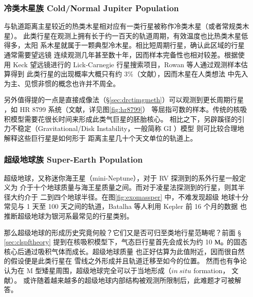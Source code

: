 \subsubsection{冷类木星族  Cold/Normal Jupiter Population}

与轨道距离主星较近的热类木星相对应有一类行星被称作冷类木星（或者常规类木星）。
此类行星在观测上拥有长于约一百天的轨道周期，有效温度也比热类木星低得多，太阳
系木星就属于一颗典型冷木星。相比短周期行星，确认此区域的行星通常需要望远镜
连续观测几年甚至数十年，因而样本完备性也相对较差\cite{Cumming2008}。根据使用
 Keck 望远镜进行的 Lick-Carnegie 行星搜索项目，Rowan 等人通过观测样本估算得到
此类行星的出现概率大概只有约 3\%（文献），因而木星在人类想法
中先入为主、见惯非惯的概念也许并不周全。

另外值得提的一点是直接成像法（\S \ref{sec:drctimgmeth}）可以观测到更长周期行星
，如 HR 8799 系统（文献，详见图\ref{fig:hr8799}）
等屈指可数的样本。传统的核吸积模型需要花很长时间来形成此类气巨星的胚胎核心。
相比之下，另辟蹊径的引力不稳定（Gravitational/Disk Instability，一般简称 GI ）模型
\cite{Kuiper1951,Cameron1978,Boss1997}则可比较合理地解释这些巨行星是如何形于
距离主星几十个天文单位的轨道上\cite{Durisen2007}。



\subsubsection{超级地球族  Super-Earth Population}

超级地球，又称迷你海王星（mini-Neptune），对于 RV 探测到的系外行星一般定义为
介于十个地球质量与海王星质量之间。而对于凌星法探测到的行星，则其半径大约介于
二到四个地球半径\cite{Haghighipour2011}。在图\ref{fig:exomassper} 中，不难发现超级
地球十分常见与 1 天至 100 天之间的轨道，Batalha 等人利用 Kepler 前 16 个月的数据
也推断超级地球为银河系最常见的行星类别\cite{Batalha2013}。

那么超级地球的形成历史究竟何般？它们又是否可归至类地行星范畴呢？前面 \S 
\ref{sec:clspftheory} 提到在核吸积模型下，气态巨行星首先会成长为约 10 
$\mathrm{M}_\oplus$ 的固态核心后通过吸积气体而成长\cite{Guillot2005}。超级地球质量
也正好估算为此值附近\cite{Lissauer2011MRR}，因而很自然的假设便是此类行星在
雪线之外形成并且轨道迁移至如今的位置\cite{Terquem2007,Kennedy2008,IdaLin2008}。
然而也有争论认为在 M 型矮星周围，超级地球完全可以于当地形成（$in\:situ$ formation，
文献）。
或许随着越来越多的超级地球内部结构被观测所限制后，此难题才可被解答\cite{Lissauer2014}。

